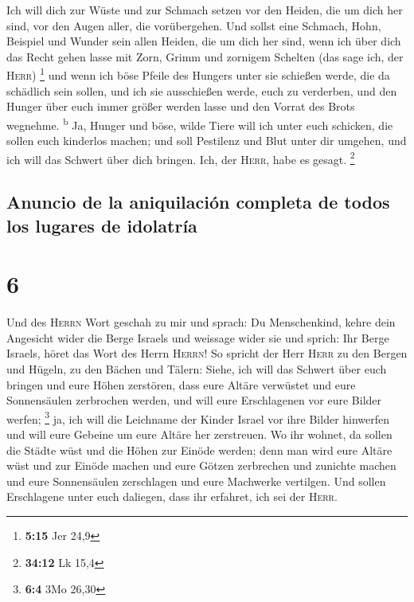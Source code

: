  Ich will dich zur Wüste und zur Schmach setzen vor den
Heiden, die um dich her sind, vor den Augen aller, die vorübergehen.
 Und sollst eine Schmach, Hohn, Beispiel und Wunder sein
allen Heiden, die um dich her sind, wenn ich über dich das Recht gehen
lasse mit Zorn, Grimm und zornigem Schelten (das sage ich, der
\textsc{Herr}) \footnote{\textbf{5:15} Jer 24,9}  und
wenn ich böse Pfeile des Hungers unter sie schießen werde, die da
schädlich sein sollen, und ich sie ausschießen werde, euch zu verderben,
und den Hunger über euch immer größer werden lasse und den Vorrat des
Brots wegnehme. \textsuperscript{b}  Ja, Hunger und böse,
wilde Tiere will ich unter euch schicken, die sollen euch kinderlos
machen; und soll Pestilenz und Blut unter dir umgehen, und ich will das
Schwert über dich bringen. Ich, der \textsc{Herr}, habe es gesagt.
\footnote{\textbf{34:12} Lk 15,4}

\hypertarget{anuncio-de-la-aniquilaciuxf3n-completa-de-todos-los-lugares-de-idolatruxeda}{%
\subsection{Anuncio de la aniquilación completa de todos los lugares de
idolatría}\label{anuncio-de-la-aniquilaciuxf3n-completa-de-todos-los-lugares-de-idolatruxeda}}

\hypertarget{section-5}{%
\section{6}\label{section-5}}

 Und des \textsc{Herrn} Wort geschah zu mir und sprach:
 Du Menschenkind, kehre dein Angesicht wider die Berge
Israels und weissage wider sie  und sprich: Ihr Berge
Israels, höret das Wort des Herrn \textsc{Herrn}! So spricht der Herr
\textsc{Herr} zu den Bergen und Hügeln, zu den Bächen und Tälern: Siehe,
ich will das Schwert über euch bringen und eure Höhen zerstören,
 dass eure Altäre verwüstet und eure Sonnensäulen
zerbrochen werden, und will eure Erschlagenen vor eure Bilder werfen;
\footnote{\textbf{6:4} 3Mo 26,30}  ja, ich will die
Leichname der Kinder Israel vor ihre Bilder hinwerfen und will eure
Gebeine um eure Altäre her zerstreuen.  Wo ihr wohnet, da
sollen die Städte wüst und die Höhen zur Einöde werden; denn man wird
eure Altäre wüst und zur Einöde machen und eure Götzen zerbrechen und
zunichte machen und eure Sonnensäulen zerschlagen und eure Machwerke
vertilgen.  Und sollen Erschlagene unter euch daliegen,
dass ihr erfahret, ich sei der \textsc{Herr}.

